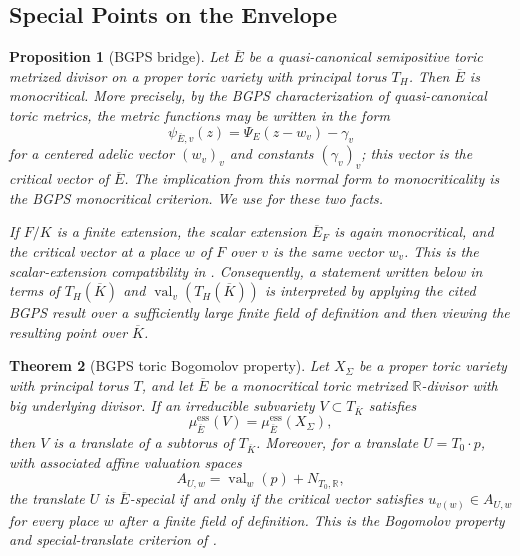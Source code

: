 \documentclass[10pt,a4paper]{amsart}
\theoremstyle{plain}
\newtheorem{theorem}{Theorem}
\newtheorem{proposition}[theorem]{Proposition}
\DeclareMathOperator{\val}{val}
\theoremstyle{plain}
\numberwithin{equation}{section}
\providecommand{\bE}{\overline{E}}
\providecommand{\muess}{\mu^{\mathrm{ess}}}
\begin{document}
\subsection{Special Points on the Envelope}

\begin{proposition}[BGPS bridge]
	\label{input:bgps-qcanonical-bridge}
	Let \(\bE\) be a quasi-\allowbreak canonical semipositive toric metrized divisor on a
	proper toric variety with principal torus \(T_H\).  Then \(\bE\) is
	monocritical.  More precisely, by the BGPS characterization of
	quasi-canonical toric metrics, the metric functions may be written in the form
	\[
	\psi_{\bE,v}(z)=\Psi_E(z-w_v)-\gamma_v
	\]
	for a centered adelic vector \((w_v)_v\) and constants \((\gamma_v)_v\);
	this vector is the critical vector of \(\bE\).  The implication from this
	normal form to monocriticality is the BGPS monocritical criterion.  We use
	\cite[Propositions 4.16 and 5.3]{BGPS19} for these two facts.
	
	If \(F/K\) is a finite extension, the scalar extension \(\bE_F\) is again
	monocritical, and the critical vector at a place \(w\) of \(F\) over \(v\) is
	the same vector \(w_v\).  This is the scalar-extension compatibility in
	\cite[Proposition 4.17]{BGPS19}.  Consequently, a statement written below in
	terms of \(T_H(\overline K)\) and \(\val_v(T_H(\overline K))\) is interpreted
	by applying the cited BGPS result over a sufficiently large finite field of
	definition and then viewing the resulting point over \(\overline K\).
\end{proposition}

\begin{theorem}[BGPS toric Bogomolov property]
	\label{input:bgps-toric-bogomolov}
	Let \(X_\Sigma\) be a proper toric variety with principal torus \(T\), and let
	\(\bE\) be a monocritical toric metrized \(\mathbb R\)-divisor with big
	underlying divisor.  If an irreducible subvariety
	\(V\subset T_{\overline K}\) satisfies
	\[
	\muess_{\bE}(V)=\muess_{\bE}(X_\Sigma),
	\]
	then \(V\) is a translate of a subtorus of \(T_{\overline K}\).  Moreover, for
	a translate \(U=T_0\cdot p\), with associated affine valuation spaces
	\[
	A_{U,w}=\val_w(p)+N_{T_0,\mathbb R},
	\]
	the translate \(U\) is \(\bE\)-special if and only if the critical vector
	satisfies \(u_{v(w)}\in A_{U,w}\) for every place \(w\) after a finite field of
	definition.  This is the Bogomolov property and special-translate criterion of
	\cite[Theorem 5.12 and Proposition 5.14]{BGPS19}.
\end{theorem}
\end{document}
